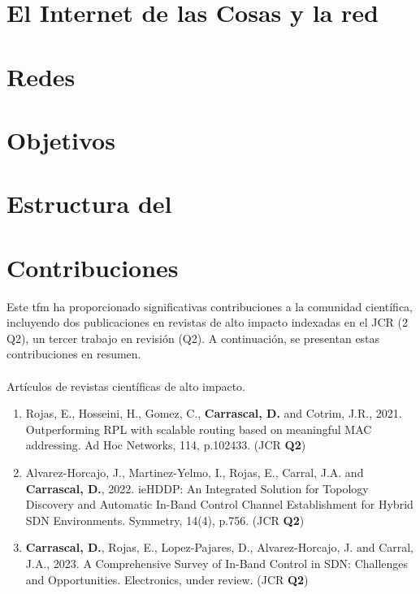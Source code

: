 \section{El Internet de las Cosas y la red }
\label{sec:6gIoT}


\section{Redes }
\label{sec:6gIoT_sdn}


\section{Objetivos}
\label{sec:obj}



\section{Estructura del }
\label{sec:structure}



\section{Contribuciones}
\label{sec:contributions}


Este \gls*{tfm} ha proporcionado significativas contribuciones a la comunidad científica, incluyendo dos publicaciones en revistas de alto impacto indexadas en el JCR (2 Q2), un tercer trabajo en revisión (Q2). A continuación, se presentan estas contribuciones en resumen.\\
\\
Artículos de revistas científicas de alto impacto.

\begin{enumerate}
    \item Rojas, E., Hosseini, H., Gomez, C., \textbf{Carrascal, D.} and Cotrim, J.R., 2021. Outperforming RPL with scalable routing based on meaningful MAC addressing. Ad Hoc Networks, 114, p.102433. (JCR \textbf{Q2})
    \item Alvarez-Horcajo, J., Martinez-Yelmo, I., Rojas, E., Carral, J.A. and \textbf{Carrascal, D.}, 2022. ieHDDP: An Integrated Solution for Topology Discovery and Automatic In-Band Control Channel Establishment for Hybrid SDN Environments. Symmetry, 14(4), p.756. (JCR \textbf{Q2})
    \item \textbf{Carrascal, D.}, Rojas, E., Lopez-Pajares, D., Alvarez-Horcajo, J. and Carral, J.A., 2023. A Comprehensive Survey of In-Band Control in SDN:
          Challenges and Opportunities. Electronics, under review. (JCR \textbf{Q2})
\end{enumerate}

